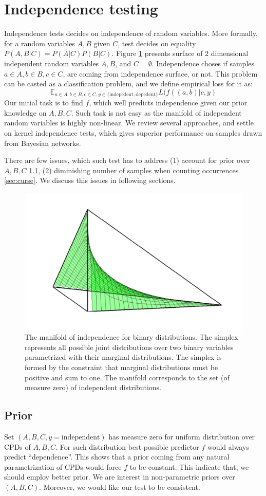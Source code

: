 \documentclass{article} %
\begin{document}
\section{Independence testing} 
Independence tests decides on independence of random variables. More formally,
for a random variables $A, B$ given $C$, test decides on equality $P(A, B| C) = P(A | C) P(B | C)$. 
Figure \ref{fig:ind} presents surface of $2$ dimensional independent 
random variables $A, B$, and $C = \emptyset$. Independence choses if samples $a \in A, b \in B, c \in C$, 
are coming from independence surface, or not. 
This problem can be casted as a classification problem, and we define
empirical loss for it as:
\begin{equation}
  \mathbb{E}_{a \in A, b \in B, c \in C, y \in \{\text{indepedent}, \text{depedent}\}} L(f((a, b)|c, y)
\end{equation}
Our initial task is to find $f$, which well predicts independence given our prior
knowledge on $A, B, C$. Such task is not easy as the manifold of independent
random variables is highly non-linear. We review several approaches, and 
settle on kernel independence tests, which gives superior performance on
samples drawn from Bayesian networks.


There are few issues, which such test has to address 
(1) account for prior over $A, B, C$ \ref{sec:prior}, (2) diminishing number of samples when
counting occurrences \ref{sec:curse}. We discuss this issues
in following sections. 


\begin{figure}[h]
\centering
\includegraphics[width=0.35\linewidth]{img/independence_surface-eps-converted-to-crop.pdf}
\caption{The manifold of independence for binary distributions. The simplex represents all possible joint distributions over two binary variables parametrized with their marginal distributions. The simplex is formed by the constraint that marginal distributions must be positive and sum to one.  The manifold corresponds to the set (of measure zero) of independent distributions.}
\label{fig:ind}
\end{figure}

\subsection{Prior}\label{sec:prior}
Set $(A, B, C, y=\text{independent})$ has measure zero for uniform
distribution over CPDs of $A, B, C$. For such distribution
best possible predictor $f$ would always predict ``dependence''. 
This shows that a prior coming from any natural parametrization
of CPDs would force $f$ to be constant. This indicate that, we should
employ better prior. We are interest in non-parametric priors over $(A, B, C)$.
Moreover, we would like our test to be consistent.
\end{document}
